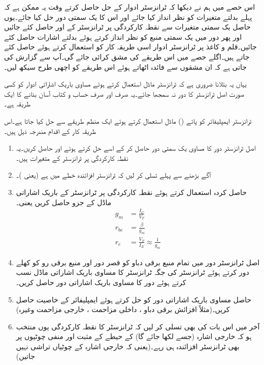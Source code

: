 اس حصے میں ہم نے دیکھا کہ ٹرانزسٹر ادوار کے حل حاصل کرتے وقت یہ ممکن ہے کہ پہلے بدلتے متغیرات کو نظر انداز کیا جائے اور اس کا یک سمتی دور حل کیا جائے۔یوں حاصل یک سمتی متغیرات سے نقطہ کارکردگی پر ٹرانزسٹر کے  اور  حاصل کئے جائیں اور پھر دور میں یک سمتی منبع کو نظر انداز کرتے ہوئے بدلتے اشارات حاصل کئے جائیں۔قلم و کاغذ پر ٹرانزسٹر ادوار اسی طریقہ کار کو استعمال کرتے ہوئے حاصل کئے جاتے ہیں۔اگلے حصے میں اس طریقے کی مشق کرائی جائے گی۔آپ سے گزارش کی جاتی ہے کہ ان مشقوں سے فائدہ اٹھاتے ہوئے اس طریقے کو اچھی طرح سیکھ لیں۔

یہاں یہ بتلانا ضروری ہے کہ ٹرانزسٹر ماڈل استعمال کرتے ہوئے مساوی باریک اشاراتی ادوار کو کسی صورت اصل ٹرانزسٹر کا دور نہ سمجھا جائے۔یہ صرف اور صرف حساب و کتاب آسان بنانے کا ایک طریقہ ہے۔

ٹرانزسٹر ایمپلیفائر کو پائے () ماڈل استعمال کرتے ہوئے ایک منظم طریقے سے حل کیا جاتا ہے۔اس طریقہ کار کے اقدام مندرجہ ذیل ہیں۔
\begin{enumerate}
\item
اصل ٹرانزسٹر دور کا مساوی یک سمتی دور حاصل کر کے اسے حل کرتے ہوئے  اور   حاصل کریں۔یہ نقطہ کارکردگی پر ٹرانزسٹر کے متغیرات ہیں۔
\item
آگے بڑھنے سے پہلے تسلی کر لیں کہ ٹرانزسٹر افزائندہ خطے میں ہے (یعنی )۔  
\item
حاصل کردہ  استعمال کرتے ہوئے نقطہ کارکردگی پر ٹرانزسٹر کے باریک 	
اشاراتی ماڈل کے جزو حاصل کریں یعنی۔
\begin{align*}
g_m &=\frac{I_C}{V_T}\\
r_{be}&=\frac{\beta}{g_m}\\
r_e&=\frac{V_T}{I_E} \approx \frac{1}{g_m}
\end{align*}

\item
اصل ٹرانزسٹر دور  میں تمام منبع برقی دباو کو قصر دور اور منبع برقی رو کو کھلے دور کرتے ہوئے ٹرانزسٹر کی جگہ ٹرانزسٹر کا مساوی باریک اشاراتی ماڈل 	نسب کرتے ہوئے دور کا مساوی باریک اشاراتی دور حاصل کریں۔
\item
حاصل مساوی باریک اشاراتی دور کو حل کرتے ہوئے ایمپلیفائر کے خاصیت 	حاصل کریں۔(مثلاً افزائش برقی دباو ، داخلی مزاحمت  ، خارجی مزاحمت  وغیرہ)

\item
آخر میں اس بات کی بھی تسلی کر لیں کہ ٹرانزسٹر کا نقطہ کارکردگی یوں منتخب ہو کہ خارجی اشارہ (جسے   لکھا جائے گا) کے حیطے کے مثبت اور منفی چوٹیوں پر بھی ٹرانزسٹر افزائندہ ہی رہے۔(یعنی کہ خارجی اشارہ   کے چوٹیاں تراشی نہیں جاتیں)
\end{enumerate}
	

